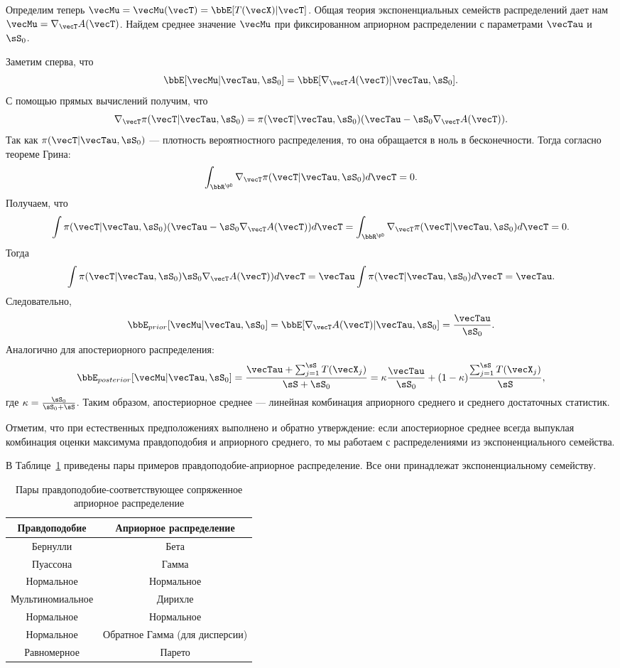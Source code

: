 Определим теперь $\vecMu = \vecMu(\vecT) = \bbE [T(\vecX) | \vecT]$.
Общая теория экспоненциальных семейств распределений 
дает нам $\vecMu = \nabla_{\vecT} A(\vecT)$.
Найдем среднее значение $\vecMu$ при фиксированном априорном распределении с параметрами $\vecTau$ и $\sS_0$.

Заметим сперва, что 
\[
\bbE [\vecMu | \vecTau, \sS_0] = \bbE [\nabla_{\vecT} A(\vecT) | \vecTau, \sS_0].
\]
С помощью прямых вычислений получим, что
\[
\nabla_{\vecT} \pi(\vecT| \vecTau, \sS_0) = \pi(\vecT| \vecTau, \sS_0) (\vecTau - \sS_0 \nabla_{\vecT} A(\vecT)).
\]
Так как $\pi(\vecT| \vecTau, \sS_0)$ --- плотность вероятностного распределения, то она обращается в ноль в бесконечности.
Тогда согласно теореме Грина:
\[
\int_{\bbR^\pD} \nabla_{\vecT} \pi(\vecT| \vecTau, \sS_0) d\vecT = 0.
\]
Получаем, что
\[
\int \pi(\vecT| \vecTau, \sS_0) (\vecTau - \sS_0 \nabla_{\vecT} A(\vecT)) d\vecT =
\int_{\bbR^\pD} \nabla_{\vecT} \pi(\vecT| \vecTau, \sS_0) d\vecT = 0.
\]
Тогда 
\[
\int \pi(\vecT| \vecTau, \sS_0) \sS_0 \nabla_{\vecT} A(\vecT)) d\vecT = \vecTau \int \pi(\vecT| \vecTau, \sS_0) d\vecT = \vecTau.
\]
Следовательно, 
\[
\bbE_{prior} [\vecMu | \vecTau, \sS_0] = \bbE [\nabla_{\vecT} A(\vecT) | \vecTau, \sS_0] = \frac{\vecTau}{\sS_0}.
\]
Аналогично для апостериорного распределения:
\[
\bbE_{posterior} [\vecMu | \vecTau, \sS_0] = \frac{\vecTau + \sum_{j = 1}^\sS T(\vecX_j)}{\sS + \sS_0} = \kappa \frac{\vecTau}{\sS_0} + (1 - \kappa) \frac{\sum_{j = 1}^\sS T(\vecX_j)}{\sS},
\]
где $\kappa = \frac{\sS_0}{\sS_0 + \sS}$.
Таким образом, апостериорное среднее --- линейная комбинация априорного среднего и среднего достаточных статистик.

Отметим, что при естественных предположениях выполнено и обратно утверждение:
если апостериорное среднее всегда выпуклая комбинация оценки максимума правдоподобия и априорного среднего,
то мы работаем с распределениями из экспоненциального семейства.

В Таблице~\ref{table:conjugate} приведены пары примеров правдоподобие-априорное распределение.
Все они принадлежат экспоненциальному семейству.

\begin{table}[h]
\centering
\begin{tabular}{cc}
\hline
Правдоподобие & Априорное распределение \\
\hline
Бернулли & Бета \\
Пуассона & Гамма \\
Нормальное & Нормальное \\
Мультиномиальное & Дирихле \\
Нормальное & Нормальное \\
Нормальное & Обратное Гамма (для дисперсии) \\
Равномерное & Парето \\
\hline
\end{tabular}
\caption{Пары правдоподобие-соответствующее сопряженное априорное распределение}
\label{table:conjugate}
\end{table}

